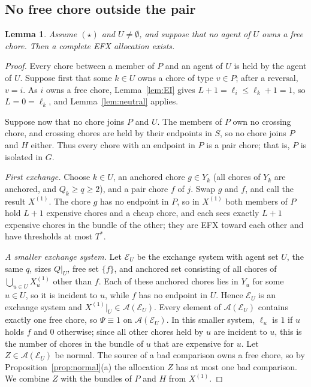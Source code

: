 \documentclass{amsart}
\numberwithin{equation}{section}
\newtheorem{lemma}[theorem]{Lemma}
\theoremstyle{definition}
\theoremstyle{remark}
\newcommand{\cA}{\mathcal{A}}
\newcommand{\cE}{\mathcal{E}}
\begin{document}
\subsection{No free chore outside the pair}

\begin{lemma}\label{lem:nofree}
Assume $(\star)$ and $U\ne\emptyset$, and suppose that no agent of $U$ owns a free chore. Then a complete EFX allocation exists.
\end{lemma}

\begin{proof}
Every chore between a member of $P$ and an agent of $U$ is held by the agent of $U$. Suppose first that some $k\in U$ owns a chore of type $v\in P$; after a reversal, $v=i$. As $i$ owns a free chore, Lemma~\ref{lem:EI} gives $L+1=\ell_i\le\ell_k+1=1$, so $L=0=\ell_k$, and Lemma~\ref{lem:neutral} applies.

Suppose now that no chore joins $P$ and $U$. The members of $P$ own no crossing chore, and crossing chores are held by their endpoints in $S$, so no chore joins $P$ and $H$ either. Thus every chore with an endpoint in $P$ is a pair chore; that is, $P$ is isolated in $G$.

\emph{First exchange.} Choose $k\in U$, an anchored chore $g\in Y_k$ (all chores of $Y_k$ are anchored, and $Q_k\ge q\ge2$), and a pair chore $f$ of $j$. Swap $g$ and $f$, and call the result $X^{(1)}$. The chore $g$ has no endpoint in $P$, so in $X^{(1)}$ both members of $P$ hold $L+1$ expensive chores and a cheap chore, and each sees exactly $L+1$ expensive chores in the bundle of the other; they are EFX toward each other and have thresholds at most $T^*$.

\emph{A smaller exchange system.} Let $\cE_U$ be the exchange system with agent set $U$, the same $q$, sizes $Q|_U$, free set $\{f\}$, and anchored set consisting of all chores of $\bigcup_{u\in U}X^{(1)}_u$ other than $f$. Each of these anchored chores lies in $Y_u$ for some $u\in U$, so it is incident to $u$, while $f$ has no endpoint in $U$. Hence $\cE_U$ is an exchange system and $X^{(1)}|_U\in\cA(\cE_U)$. Every element of $\cA(\cE_U)$ contains exactly one free chore, so $\Psi\equiv1$ on $\cA(\cE_U)$. In this smaller system, $\ell_u$ is $1$ if $u$ holds $f$ and $0$ otherwise; since all other chores held by $u$ are incident to $u$, this is the number of chores in the bundle of $u$ that are expensive for $u$. Let $Z\in\cA(\cE_U)$ be normal. The source of a bad comparison owns a free chore, so by Proposition~\ref{prop:normal}(a) the allocation $Z$ has at most one bad comparison. We combine $Z$ with the bundles of $P$ and $H$ from $X^{(1)}$.


\end{proof}
\end{document}
